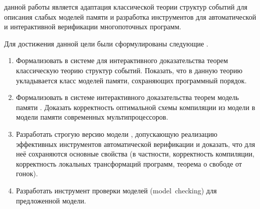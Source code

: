 

{\aim} данной работы является адаптация классической теории структур событий
для описания слабых моделей памяти и разработка  
инструментов для автоматической и интерактивной верификации многопоточных программ. 

Для достижения данной цели были сформулированы следующие {\tasks}.
\begin{enumerate}[beginpenalty=10000] %
  \item
    Формализовать в системе для интерактивного доказательства теорем \coq
    классическую теорию структур событий. Показать, что
    в данную теорию укладывается класс моделей памяти,
    сохраняющих программный порядок.
  \item
    Формализовать в системе интерактивного доказательства теорем \coq
    модель памяти \Wkm.
    Доказать корректность оптимальной схемы компиляции
    из модели \Wkm в модели памяти современных мультипроцессоров.
  \item
    Разработать строгую версию модели \Wkm, 
    допускающую реализацию эффективных инструментов автоматической верификации
    и доказать, что для неё сохраняются основные свойства \Wkm  
    (в частности, корректность компиляции, корректность локальных трансформаций программ, 
     теорема о свободе от гонок).
  \item
    Разработать инструмент проверки моделей (model~checking) для предложенной модели.
\end{enumerate}

